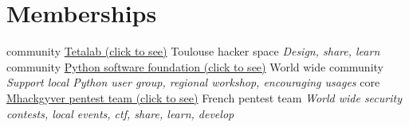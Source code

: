 \documentclass[]{friggeri-cv}
\begin{document}
\section{Memberships}
\begin{entrylist}
    \entry
        {community}
        {\href{https://www.tetalab.org/en}{Tetalab (click to see)}}
        {Toulouse hacker space}
        {\emph{Design, share, learn}}
    \entry
        {community}
        {\href{https://www.python.org/psf/}{Python software foundation (click to see)}}
        {World wide community}
        {\emph{Support local Python user group, regional workshop, encouraging usages}}
    \entry
        {core}
        {\href{https://github.com/mhackgyver-squad/mhackgyver}{Mhackgyver pentest team (click to see)}}
        {French pentest team}
        {\emph{World wide security contests, local events, ctf, share, learn, develop}}
\end{entrylist}

\newpage
\end{document}
